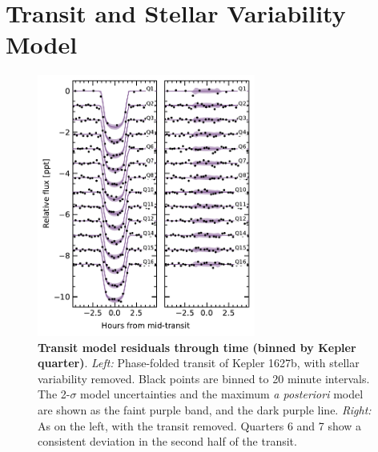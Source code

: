 \documentclass[12pt,modern,twocolumn,tighten]{aastex63}
\begin{document}
\section{Transit and Stellar Variability Model}
\label{app:gptransit}

\begin{figure}[t]
	\begin{center}
		\leavevmode
		\includegraphics[width=0.64\textwidth]{f9.pdf}
	\end{center}
	\vspace{-0.7cm}
	\caption{
		{\bf Transit model residuals through time (binned by Kepler quarter)}.  
    {\it Left:}
    Phase-folded transit of Kepler 1627b, with stellar variability
    removed.  Black points are binned to 20
    minute intervals.  The 2-$\sigma$ model uncertainties and the
    maximum {\it a posteriori} model are shown as the faint purple
    band, and the dark purple line.
    {\it Right:}
    As on the left, with the transit removed.  Quarters 6 and 7 show a
    consistent deviation in the second half of the transit.
		\label{fig:phasequarter}
	}
\end{figure}
\end{document}
